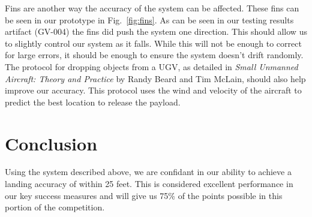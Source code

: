 \documentclass[]{auvsi_doc}
\begin{document}
Fins are another way the accuracy of the system can be affected. These fins can be seen in our prototype in Fig.~\ref{fig:fins}. As can be seen in our testing results artifact (GV-004) the fins did push the system one direction. This should allow us to slightly control our system as it falls. While this will not be enough to correct for large errors, it should be enough to ensure the system doesn't drift randomly. The protocol for dropping objects from a UGV, as detailed in \textit{Small Unmanned Aircraft: Theory and Practice} by Randy Beard and Tim McLain, should also help improve our accuracy. This protocol uses the wind and velocity of the aircraft to predict the best location to release the payload.


\section{Conclusion}
Using the system described above, we are confidant in our ability to achieve a landing accuracy of within 25 feet. This is considered excellent performance in our key success measures and will give us 75\% of the points possible in this portion of the competition. 
\end{document}
